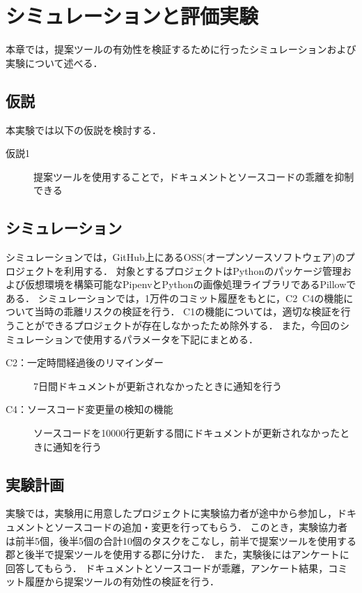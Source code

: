 \chapter{シミュレーションと評価実験}
本章では，提案ツールの有効性を検証するために行ったシミュレーションおよび実験について述べる．

\section{仮説}
本実験では以下の仮説を検討する．

\begin{description}
    \item[仮説1] 提案ツールを使用することで，ドキュメントとソースコードの乖離を抑制できる
\end{description}

\section{シミュレーション}
\label{sim}
シミュレーションでは，GitHub上にあるOSS(オープンソースソフトウェア)のプロジェクトを利用する．
対象とするプロジェクトはPythonのパッケージ管理および仮想環境を構築可能なPipenv\cite{pipenv}とPythonの画像処理ライブラリであるPillow\cite{pillow}である．
シミュレーションでは，1万件のコミット履歴をもとに，C2~C4の機能について当時の乖離リスクの検証を行う．
C1の機能については，適切な検証を行うことができるプロジェクトが存在しなかったため除外する．
また，今回のシミュレーションで使用するパラメータを下記にまとめる．
\begin{description}
    \item[C2：一定時間経過後のリマインダー] 7日間ドキュメントが更新されなかったときに通知を行う
    \item[C4：ソースコード変更量の検知の機能] ソースコードを10000行更新する間にドキュメントが更新されなかったときに通知を行う
\end{description}

\section{実験計画}
\label{plan}
実験では，実験用に用意したプロジェクトに実験協力者が途中から参加し，ドキュメントとソースコードの追加・変更を行ってもらう．
このとき，実験協力者は前半5個，後半5個の合計10個のタスクをこなし，前半で提案ツールを使用する郡と後半で提案ツールを使用する郡に分けた．
また，実験後にはアンケートに回答してもらう．
ドキュメントとソースコードが乖離，アンケート結果，コミット履歴から提案ツールの有効性の検証を行う．

